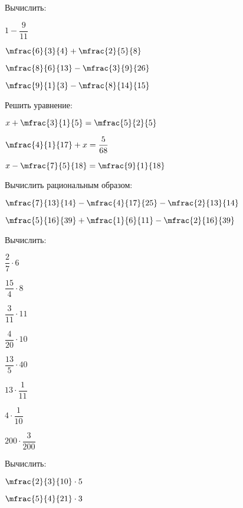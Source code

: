 \begin{homework}[number=1]
	\begin{listofex}
		\item Вычислить:
		\begin{enumcols}[itemcolumns=4]
			\item \( 1-\dfrac{9}{11} \)
			\item \( \mfrac{6}{3}{4}+\mfrac{2}{5}{8} \)
			\item \( \mfrac{8}{6}{13}-\mfrac{3}{9}{26} \)
			\item \( \mfrac{9}{1}{3}-\mfrac{8}{14}{15} \)
		\end{enumcols}
		\item Решить уравнение:
		\begin{enumcols}[itemcolumns=3]
			\item \( x+\mfrac{3}{1}{5}=\mfrac{5}{2}{5} \)
			\item \( \mfrac{4}{1}{17}+x=\dfrac{5}{68} \)
			\item \( x-\mfrac{7}{5}{18}=\mfrac{9}{1}{18} \)
		\end{enumcols}
		\item Вычислить рациональным образом:
		\begin{enumcols}[itemcolumns=2]
			\item \( \mfrac{7}{13}{14}-\mfrac{4}{17}{25}-\mfrac{2}{13}{14} \)
			\item \( \mfrac{5}{16}{39}+\mfrac{1}{6}{11}-\mfrac{2}{16}{39} \)
		\end{enumcols}
		\item Вычислить:
		\begin{enumcols}[itemcolumns=4]
			\item \( \dfrac{2}{7}\cdot6 \)
			\item \( \dfrac{15}{4}\cdot8 \)
			\item \( \dfrac{3}{11}\cdot11 \)
			\item \( \dfrac{4}{20}\cdot10 \)
			\item \( \dfrac{13}{5}\cdot40 \)
			\item \( 13\cdot\dfrac{1}{11} \)
			\item \( 4\cdot\dfrac{1}{10} \)
			\item \( 200\cdot\dfrac{3}{200} \)
		\end{enumcols}
		\item Вычислить:
		\begin{enumcols}[itemcolumns=4]
			\item \( \mfrac{2}{3}{10}\cdot5 \)
			\item \( \mfrac{5}{4}{21}\cdot3 \)

\end{enumcols}
\end{listofex}
\end{homework}
